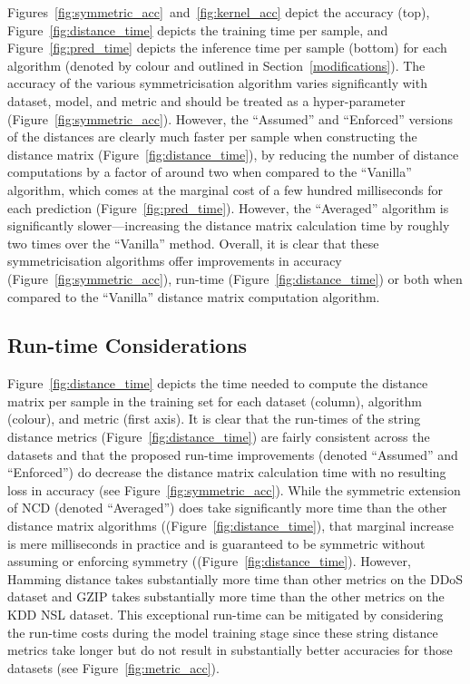 \documentclass[preprint,12pt]{article}
\begin{document}
Figures~\ref{fig:symmetric_acc}~and~\ref{fig:kernel_acc} depict the accuracy (top), Figure~\ref{fig:distance_time} depicts the training time per sample, and Figure~\ref{fig:pred_time} depicts the inference time per sample (bottom) for each algorithm (denoted by colour and outlined in Section~\ref{modifications}).
The accuracy of the various symmetricisation algorithm varies significantly with dataset, model, and metric and should be treated as a hyper-parameter (Figure~\ref{fig:symmetric_acc}). 
However, the ``Assumed'' and ``Enforced'' versions of the distances are clearly much faster per sample when constructing the distance matrix (Figure~\ref{fig:distance_time}), by reducing the number of distance computations by a factor of around two when compared to the ``Vanilla'' algorithm, which comes at the marginal cost of a few hundred milliseconds for each prediction (Figure~\ref{fig:pred_time}). 
However, the ``Averaged'' algorithm is significantly slower---increasing the distance matrix calculation time by roughly two times over the ``Vanilla'' method.
Overall, it is clear that these symmetricisation algorithms offer improvements in accuracy (Figure~\ref{fig:symmetric_acc}), run-time (Figure~\ref{fig:distance_time}) or both when compared to the ``Vanilla'' distance matrix computation algorithm.



\subsection{Run-time Considerations}

Figure~\ref{fig:distance_time} depicts the time needed to compute the distance matrix per sample in the training set for each dataset (column), algorithm (colour), and metric (first axis).
It is clear that the run-times of the string distance metrics (Figure~\ref{fig:distance_time}) are fairly consistent across the datasets and that the proposed run-time improvements (denoted ``Assumed'' and ``Enforced'') do decrease the distance matrix calculation time with no resulting loss in accuracy (see Figure~\ref{fig:symmetric_acc}).
While the symmetric extension of NCD (denoted ``Averaged'') does take significantly more time than the other distance matrix algorithms ((Figure~\ref{fig:distance_time}), that marginal increase is mere milliseconds in practice and is guaranteed to be symmetric without assuming or enforcing symmetry ((Figure~\ref{fig:distance_time}).
However, Hamming distance takes substantially more time than other metrics on the DDoS dataset and GZIP takes substantially more time than the other metrics on the KDD NSL dataset.
This exceptional run-time can be mitigated by considering the run-time costs during the model training stage since these string distance metrics take longer but do not result in substantially better accuracies for those datasets (see Figure~\ref{fig:metric_acc}).
\end{document}
